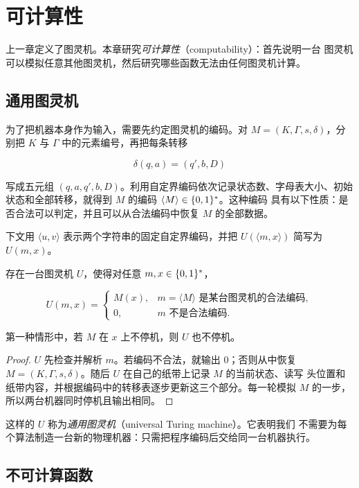 \chapter{可计算性}
\label{chap:computability}

上一章定义了图灵机。本章研究\emph{可计算性}（computability）：首先说明一台
图灵机可以模拟任意其他图灵机，然后研究哪些函数无法由任何图灵机计算。

\section{通用图灵机}

为了把机器本身作为输入，需要先约定图灵机的编码。对
$M=(K,\Gamma,s,\delta)$，分别把 $K$ 与 $\Gamma$ 中的元素编号，再把每条转移

\[
  \delta(q,a)=(q',b,D)
\]

写成五元组 $(q,a,q',b,D)$。利用自定界编码依次记录状态数、字母表大小、初始
状态和全部转移，就得到 $M$ 的编码 $\langle M\rangle\in\{0,1\}^{*}$。这种编码
具有以下性质：是否合法可以判定，并且可以从合法编码中恢复 $M$ 的全部数据。

下文用 $\langle u,v\rangle$ 表示两个字符串的固定自定界编码，并把
$U(\langle m,x\rangle)$ 简写为 $U(m,x)$。

\begin{theorem}[通用图灵机]
  \label{thm:universal-turing-machine}
  存在一台图灵机 $U$，使得对任意 $m,x\in\{0,1\}^{*}$，

  \[
    U(m,x)=
    \begin{cases}
      M(x),&m=\langle M\rangle\text{ 是某台图灵机的合法编码},\\
      0,&m\text{ 不是合法编码}.
    \end{cases}
  \]

  第一种情形中，若 $M$ 在 $x$ 上不停机，则 $U$ 也不停机。
\end{theorem}

\begin{proof}
  $U$ 先检查并解析 $m$。若编码不合法，就输出 $0$；否则从中恢复
  $M=(K,\Gamma,s,\delta)$。随后 $U$ 在自己的纸带上记录 $M$ 的当前状态、读写
  头位置和纸带内容，并根据编码中的转移表逐步更新这三个部分。每一轮模拟 $M$
  的一步，所以两台机器同时停机且输出相同。
\end{proof}

这样的 $U$ 称为\emph{通用图灵机}（universal Turing machine）。它表明我们
不需要为每个算法制造一台新的物理机器：只需把程序编码后交给同一台机器执行。

\section{不可计算函数}

